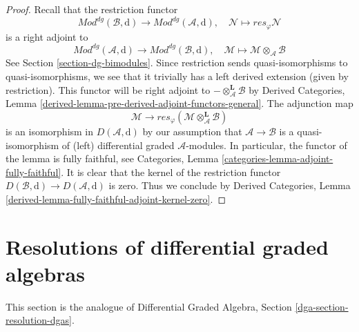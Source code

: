 \documentclass{stacks-project}
\theoremstyle{plain}
\theoremstyle{definition}
\theoremstyle{remark}
\numberwithin{equation}{subsection}
\begin{document}
\begin{proof}
Recall that the restriction functor
$$
\textit{Mod}^{dg}(\mathcal{B}, \text{d}) \to
\textit{Mod}^{dg}(\mathcal{A}, \text{d}),\quad
\mathcal{N} \mapsto res_\varphi \mathcal{N}
$$
is a right adjoint to
$$
\textit{Mod}^{dg}(\mathcal{A}, \text{d}) \to
\textit{Mod}^{dg}(\mathcal{B}, \text{d}),\quad
\mathcal{M} \mapsto \mathcal{M} \otimes_\mathcal{A} \mathcal{B}
$$
See Section \ref{section-dg-bimodules}. Since restriction
sends quasi-isomorphisms to quasi-isomorphisms, we see that
it trivially has a left derived extension (given by
restriction). This functor will be right adjoint to
$- \otimes_\mathcal{A}^\mathbf{L} \mathcal{B}$ by
Derived Categories, Lemma
\ref{derived-lemma-pre-derived-adjoint-functors-general}.
The adjunction map
$$
\mathcal{M} \to
res_\varphi(\mathcal{M} \otimes_\mathcal{A}^\mathbf{L} \mathcal{B})
$$
is an isomorphism in $D(\mathcal{A}, \text{d})$ by our assumption
that $\mathcal{A} \to \mathcal{B}$ is a quasi-isomorphism of
(left) differential graded $\mathcal{A}$-modules. In particular,
the functor of the lemma is fully faithful, see
Categories, Lemma \ref{categories-lemma-adjoint-fully-faithful}.
It is clear that the kernel of the restriction functor
$D(\mathcal{B}, \text{d}) \to D(\mathcal{A}, \text{d})$
is zero. Thus we conclude by Derived Categories, Lemma
\ref{derived-lemma-fully-faithful-adjoint-kernel-zero}.
\end{proof}













\section{Resolutions of differential graded algebras}
\label{section-resolution-dgas}

\noindent
This section is the analogue of
Differential Graded Algebra, Section \ref{dga-section-resolution-dgas}.
\end{document}
